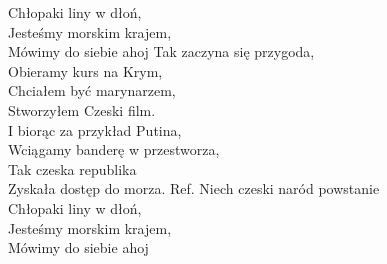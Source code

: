  Chłopaki liny w dłoń, \tab{}\\
 Jesteśmy morskim krajem, \\
 Mówimy do siebie ahoj \tab{}
\hops
Tak zaczyna się przygoda,\\
Obieramy kurs na Krym,\\
Chciałem być marynarzem,\\
Stworzyłem Czeski film.\\
I biorąc za przykład Putina,\tab{}\\
Wciągamy banderę w przestworza,\\
Tak czeska republika\tab{}\\
Zyskała dostęp do morza.\tab{}
\hops
Ref. Niech czeski naród powstanie \\
 Chłopaki liny w dłoń, \tab{}\\
 Jesteśmy morskim krajem, \\
 Mówimy do siebie ahoj \tab{}